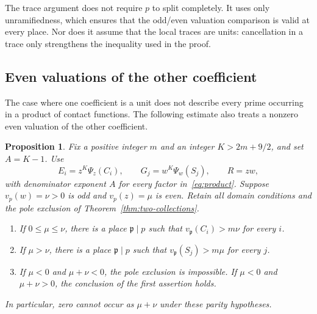 \documentclass[11pt,a4paper]{article}
\newtheorem{proposition}[theorem]{Proposition}
\begin{document}
The trace argument does not require $p$ to split completely.
It uses only unramifiedness, which ensures that the odd/even valuation
comparison is valid at every place. Nor does it assume that the
local traces are units: cancellation in a trace only strengthens the
inequality used in the proof.

\subsection{Even valuations of the other coefficient}

The case where one coefficient is a unit does not describe every
prime occurring in a product of contact functions. The following
estimate also treats a nonzero even valuation of the other coefficient.

\begin{proposition}\label{prop:even-strata}
Fix a positive integer $m$ and an integer $K>2m+9/2$, and set $A=K-1$.
Use
\[
 E_i=z^K\Psi_z(C_i),\qquad G_j=w^K\Psi_w(S_j),\qquad R=zw,
\]
with denominator exponent $A$ for every factor in~\eqref{eq:product}.
Suppose $v_p(w)=\nu>0$ is odd and $v_p(z)=\mu$ is even.
Retain all domain conditions and the pole exclusion of
Theorem~\ref{thm:two-collections}.
\begin{enumerate}
\item If $0\le\mu\le\nu$, there is a place $\mathfrak p\mid p$
such that $v_{\mathfrak p}(C_i)>m\nu$ for every $i$.
\item If $\mu>\nu$, there is a place $\mathfrak p\mid p$
such that $v_{\mathfrak p}(S_j)>m\mu$ for every $j$.
\item If $\mu<0$ and $\mu+\nu<0$, the pole exclusion is impossible.
If $\mu<0$ and $\mu+\nu>0$, the conclusion of the first assertion
holds.
\end{enumerate}
In particular, zero cannot occur as $\mu+\nu$ under these parity
hypotheses.
\end{proposition}
\end{document}
